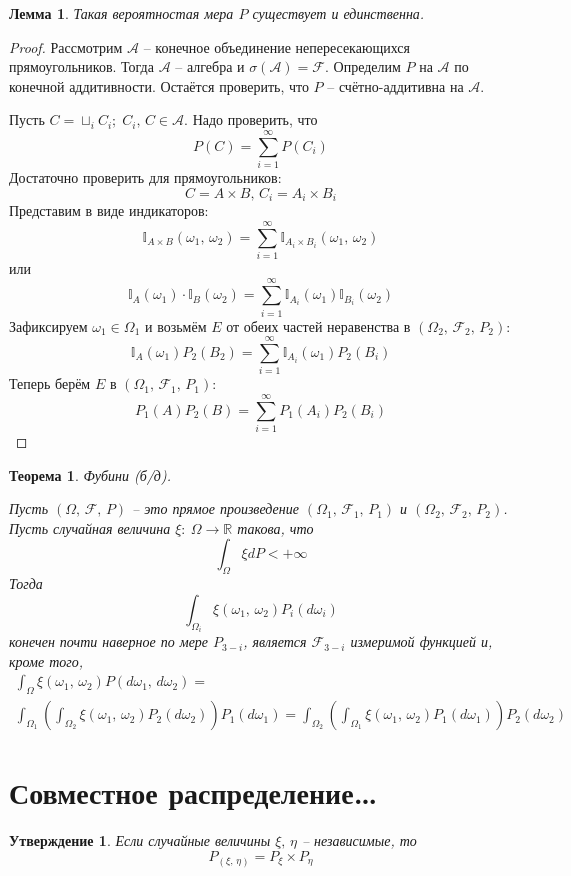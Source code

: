 \documentclass[a4paper,12pt]{article}
\theoremstyle{plain}
\newtheorem{theorem}{Теорема}[section]
\newtheorem{lemma}{Лемма}[section]
\newtheorem{proposition}{Утверждение}[section]
\theoremstyle{definition}
\theoremstyle{remark}
\begin{document}
\begin{lemma}
  Такая вероятностая мера $P$ существует и единственна.
\end{lemma}

\begin{proof}
  Рассмотрим $\mathcal{A}$ -- конечное объединение непересекающихся прямоугольников. Тогда $\mathcal{A}$ -- алгебра и $\sigma(\mathcal{A}) = \mathcal{F}$. Определим $P$ на $\mathcal{A}$ по конечной аддитивности. Остаётся проверить, что $P$ -- счётно-аддитивна на $\mathcal{A}$.

  Пусть $C = \sqcup_i C_i;\; C_i,\,C \in \mathcal{A}$. Надо проверить, что 
  \[P(C) = \sum_{i = 1}^\infty P(C_i)\]
  Достаточно проверить для прямоугольников:
  \[C = A \times B,\, C_i = A_i \times B_i\]
  Представим в виде индикаторов:
  \[\mathbb{I}_{A \times B}(\omega_1,\, \omega_2) = \sum_{i = 1}^\infty \mathbb{I}_{A_i \times B_i}(\omega_1,\,\omega_2)\]
  или
  \[\mathbb{I}_A(\omega_1)\cdot\mathbb{I}_B(\omega_2) = \sum_{i = 1}^\infty \mathbb{I}_{A_i}(\omega_1)\mathbb{I}_{B_i}(\omega_2)\]
  Зафиксируем $\omega_1 \in \Omega_1$ и возьмём $E$ от обеих частей неравенства в $(\Omega_2,\, \mathcal{F}_2,\, P_2)$:
  \[\mathbb{I}_A(\omega_1)P_2(B_2) = \sum_{i = 1}^\infty \mathbb{I}_{A_i}(\omega_1)P_2(B_i)\]
  Теперь берём $E$ в $(\Omega_1,\, \mathcal{F}_1,\, P_1)$:
  \[P_1(A)P_2(B) = \sum_{i = 1}^\infty P_1(A_i)P_2(B_i)\]
\end{proof}

\begin{theorem}
  Фубини (б/д).

  Пусть $(\Omega,\, \mathcal{F},\, P)$ -- это прямое произведение $(\Omega_1,\, \mathcal{F}_1,\, P_1)$ и $(\Omega_2,\, \mathcal{F}_2,\, P_2)$. Пусть случайная величина $\xi:\: \Omega \to \mathbb{R}$ такова, что 
  \[\int_\Omega \xi dP < +\infty\]
  Тогда 
  \[\int_{\Omega_i}\xi(\omega_1,\, \omega_2)P_i(d\omega_i)\]
  конечен почти наверное по мере $P_{3 - i}$, является $\mathcal{F}_{3 - i}$ измеримой функцией и, кроме того,
  \begin{align*}
    \int_\Omega \xi(\omega_1,\, \omega_2)P(d\omega_1,\, d\omega_2) = \\
    \int_{\Omega_1}\left(\int_{\Omega_2}\xi(\omega_1,\, \omega_2)P_2(d\omega_2)\right)P_1(d\omega_1) = \int_{\Omega_2}\left(\int_{\Omega_1}\xi(\omega_1,\, \omega_2)P_1(d\omega_1)\right)P_2(d\omega_2)
  \end{align*}
\end{theorem}

\section{Совместное распределение\dots}
\begin{proposition}
  Если случайные величины $\xi,\,\eta$ -- независимые, то
  \[P_{(\xi,\,\eta)} = P_\xi \times P_\eta\]
\end{proposition}
\end{document}
